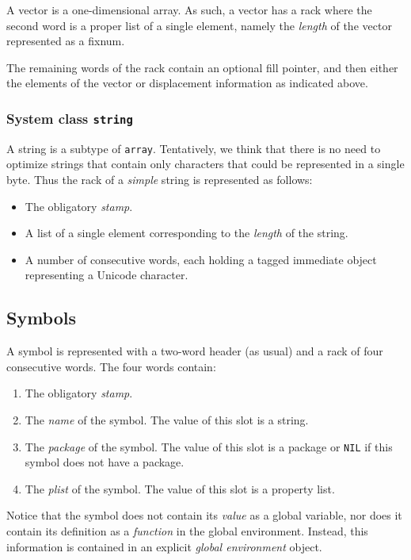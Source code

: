 A vector is a one-dimensional array.  As such, a vector has a rack
where the second word is a proper list of a single element,
namely the \emph{length} of the vector represented as a fixnum.

The remaining words of the rack contain an optional fill
pointer, and then either the elements of the vector or displacement
information as indicated above.

\subsubsection{System class \texttt{string}}

A string is a subtype of \texttt{array}.  Tentatively, we think that
there is no need to optimize strings that contain only characters that
could be represented in a single byte.  Thus the rack of a
\emph{simple} string is represented as follows:

\begin{itemize}
\item The obligatory \emph{stamp}.
\item A list of a single element corresponding to the \emph{length} of
  the string.
\item A number of consecutive words, each holding a tagged immediate
  object representing a Unicode character.
\end{itemize}

\subsection{Symbols}

A symbol is represented with a two-word header (as usual) and a
rack of four consecutive words.  The four words contain:

\begin{enumerate}
\item The obligatory \emph{stamp}.
\item The \emph{name} of the symbol.  The value of this slot is a
  string.
\item The \emph{package} of the symbol.  The value of this slot is a
  package or \texttt{NIL} if this symbol does not have a package.
\item The \emph{plist} of the symbol.  The value of this slot is a
  property list.
\end{enumerate}

Notice that the symbol does not contain its \emph{value} as a global
variable, nor does it contain its definition as a \emph{function} in
the global environment.  Instead, this information is contained in an
explicit \emph{global environment} object.

